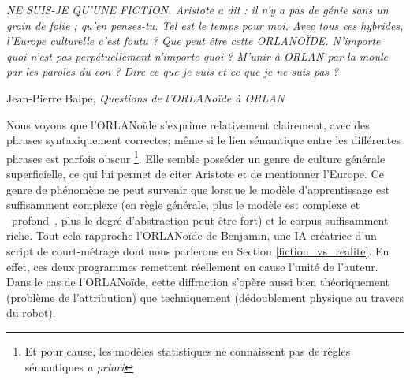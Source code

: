 \documentclass{article}
\newenvironment{citationbox}
{\begin{center}
		\begin{minipage}{.8\textwidth}
		}
		{
		\end{minipage}	
\end{center}
}
\begin{document}
				\begin{citationbox}
					\textit{NE SUIS-JE QU'UNE FICTION. Aristote a dit : il n'y a pas de génie sans un grain de folie ; qu’en penses-tu. Tel est le temps pour moi. Avec tous ces hybrides, l’Europe culturelle c'est foutu ? Que peut être cette ORLANOÏDE. N'importe quoi n'est pas perpétuellement n'importe quoi ? M'unir à ORLAN par la moule par les paroles du con ? Dire ce que je suis et ce que je ne suis pas ?}
					\begin{flushright}
						Jean-Pierre Balpe, \textit{Questions de l'ORLANoïde à ORLAN} \autocite{balpe_site}
					\end{flushright}
				\end{citationbox}
				Nous voyons que l'ORLANoïde s'exprime relativement clairement, avec des phrases syntaxiquement correctes; même si le lien sémantique entre les différentes phrases est parfois obscur \footnote{Et pour cause, les modèles statistiques ne connaissent pas de règles sémantiques \textit{a priori}}. Elle semble posséder un genre de culture générale superficielle, ce qui lui permet de citer Aristote et de mentionner l'Europe. Ce genre de phénomène ne peut survenir que lorsque le modèle d'apprentissage est suffisamment complexe (en règle générale, plus le modèle est complexe et \guillemotleft~profond~\guillemotright, plus le degré d'abstraction peut être fort) et le corpus suffisamment riche. Tout cela rapproche l'ORLANoïde de Benjamin, une IA créatrice d'un script de court-métrage dont nous parlerons en Section \ref{fiction_vs_realite}. En effet, ces deux programmes remettent réellement en cause l'unité de l'auteur. Dans le cas de l'ORLANoïde, cette diffraction s'opère aussi bien théoriquement (problème de l'attribution) que techniquement (dédoublement physique au travers du robot).
				
\end{document}
